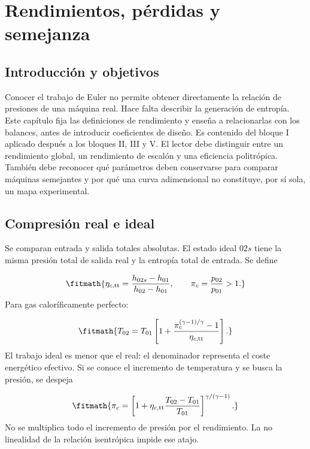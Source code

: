 \documentclass[10pt,openany]{book}
\begin{document}
\studiumchaptercheck

\chapter{Rendimientos, pérdidas y semejanza}
\label{chap:c03}


\section{Introducción y objetivos}

Conocer el trabajo de Euler no permite obtener directamente la relación de presiones de una máquina real. Hace falta describir la generación de entropía. Este capítulo fija las definiciones de rendimiento y enseña a relacionarlas con los balances, antes de introducir coeficientes de diseño. Es contenido del bloque I aplicado después a los bloques II, III y V.
El lector debe distinguir entre un rendimiento global, un rendimiento de escalón y una eficiencia politrópica. También debe reconocer qué parámetros deben conservarse para comparar máquinas semejantes y por qué una curva adimensional no constituye, por sí sola, un mapa experimental.

\section{Compresión real e ideal}

Se comparan entrada y salida totales absolutas. El estado ideal \(02s\) tiene la misma presión total de salida real y la entropía total de entrada. Se define

\[
\fitmath{\eta_{c,\mathrm{tt}}=\frac{h_{02s}-h_{01}}{h_{02}-h_{01}},\qquad
\pi_c=\frac{p_{02}}{p_{01}}>1.}
\]
Para gas caloríficamente perfecto:

\[
\fitmath{T_{02}=T_{01}\left[1+\frac{\pi_c^{(\gamma-1)/\gamma}-1}{\eta_{c,\mathrm{tt}}}\right].}
\]
El trabajo ideal es menor que el real: el denominador representa el coste energético efectivo. Si se conoce el incremento de temperatura y se busca la presión, se despeja

\[
\fitmath{\pi_c=\left[1+\eta_{c,\mathrm{tt}}\frac{T_{02}-T_{01}}{T_{01}}\right]^{\gamma/(\gamma-1)}.}
\]
No se multiplica todo el incremento de presión por el rendimiento. La no linealidad de la relación isentrópica impide ese atajo.
\end{document}
